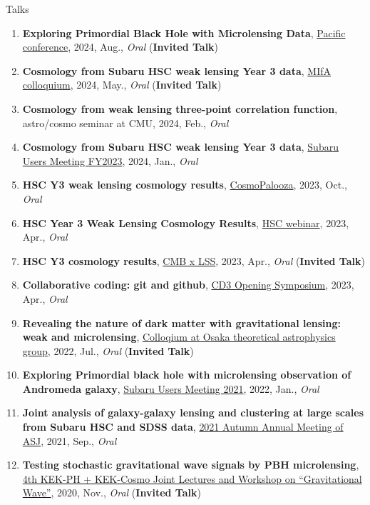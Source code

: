 \begin{rSection}{Talks}
\begin{enumerate}[itemsep=0pt, parsep=0pt, topsep=0pt, partopsep=0pt]
\item \textbf{Exploring Primordial Black Hole with Microlensing Data}, \href{https://pacific-conference.pa.ucla.edu/index.html}{Pacific conference}, 2024, Aug., \textit{Oral} (\textbf{Invited Talk})
\item \textbf{Cosmology from Subaru HSC weak lensing Year 3 data}, \href{https://cse.umn.edu/physics/minnesota-institute-astrophysics-mifa-colloquium}{MIfA colloquium}, 2024, May., \textit{Oral} (\textbf{Invited Talk})
\item \textbf{Cosmology from weak lensing three-point correlation function}, astro/cosmo seminar at CMU, 2024, Feb., \textit{Oral}
\item \textbf{Cosmology from Subaru HSC weak lensing Year 3 data}, \href{https://www.subarutelescope.org/Science/SubaruUM/SubaruUM2023/index.html}{Subaru Users Meeting FY2023}, 2024, Jan., \textit{Oral}
\item \textbf{HSC Y3 weak lensing cosmology results}, \href{https://cosmopalooza.lbl.gov/}{CosmoPalooza}, 2023, Oct., \textit{Oral}
\item \textbf{HSC Year 3 Weak Lensing Cosmology Results}, \href{https://hsc-release.mtk.nao.ac.jp/doc/index.php/wly3/}{HSC webinar}, 2023, Apr., \textit{Oral}
\item \textbf{HSC Y3 cosmology results}, \href{https://www2.yukawa.kyoto-u.ac.jp/~cmb-lss/index.php}{CMB x LSS}, 2023, Apr., \textit{Oral} (\textbf{Invited Talk})
\item \textbf{Collaborative coding: git and github}, \href{https://cd3.ipmu.jp/opening/}{CD3 Opening Symposium}, 2023, Apr., \textit{Oral}
\item \textbf{Revealing the nature of dark matter with gravitational lensing: weak and microlensing}, \href{http://astro-osaka.jp/OUTAP/colloquium-abstracts.html#sugiyama}{Colloqium at Osaka theoretical astrophysics group}, 2022, Jul., \textit{Oral} (\textbf{Invited Talk})
\item \textbf{Exploring Primordial black hole with microlensing observation of Andromeda galaxy}, \href{https://subarutelescope.org/Science/SubaruUM/SubaruUM2021/}{Subaru Users Meeting 2021}, 2022, Jan., \textit{Oral}
\item \textbf{Joint analysis of galaxy-galaxy lensing and clustering at large scales from Subaru HSC and SDSS data}, \href{https://www.asj.or.jp/nenkai/archive/2021b/pdf/U05a.pdf}{2021 Autumn Annual Meeting of ASJ}, 2021, Sep., \textit{Oral}
\item \textbf{Testing stochastic gravitational wave signals by PBH microlensing}, \href{http://conference-indico.kek.jp/event/117/timetable/#day-2020-11-04}{4th KEK-PH + KEK-Cosmo Joint Lectures and Workshop on ``Gravitational Wave''}, 2020, Nov., \textit{Oral} (\textbf{Invited Talk})
\end{enumerate}\end{rSection}
